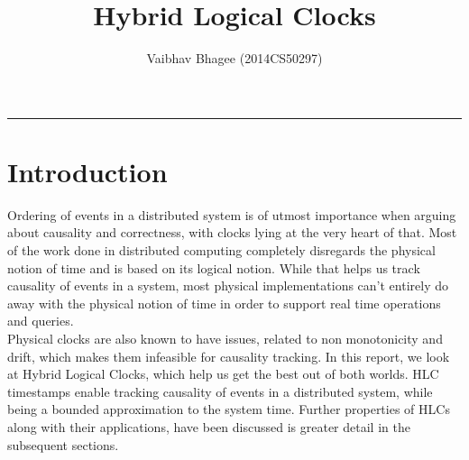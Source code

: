 \documentclass{article}
\title{\textbf{Hybrid Logical Clocks}}
\author{Vaibhav Bhagee (2014CS50297)}
\date{}
\begin{document}
\maketitle

\begin{center}
\noindent\rule{3.2cm}{0.4pt} 
\end{center}

    \section{Introduction}

    Ordering of events in a distributed system is of utmost importance when arguing about causality and correctness, with clocks lying at the very heart of that. Most of the work done in distributed computing completely disregards the physical notion of time and is based on its logical notion. While that helps us track causality of events in a system, most physical implementations can't entirely do away with the physical notion of time in order to support real time operations and queries. \\

    Physical clocks are also known to have issues, related to non monotonicity and drift, which makes them infeasible for causality tracking. In this report, we look at Hybrid Logical Clocks\cite{hlc}, which help us get the best out of both worlds. HLC timestamps enable tracking causality of events in a distributed system, while being a bounded approximation to the system time. Further properties of HLCs along with their applications, have been discussed is greater detail in the subsequent sections.


    


    





    


    




\end{document}
